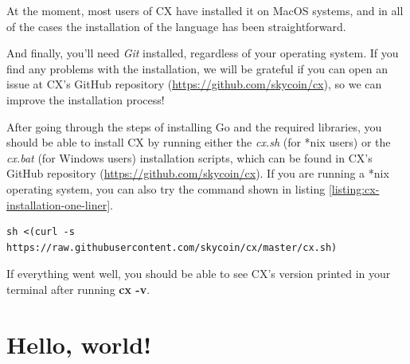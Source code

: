 \documentclass[11pt,fleqn,openany]{book} %
\begin{document}
At the moment, most users of CX have installed it on MacOS systems, and in all of the cases the installation of the language has been straightforward.

And finally, you'll need \emph{Git} installed, regardless of your operating system. If you find any problems with the installation, we will be grateful if you can open an issue at CX's GitHub repository (\url{https://github.com/skycoin/cx}), so we can improve the installation process!

After going through the steps of installing Go and the required libraries, you should be able to install CX by running either the \emph{cx.sh} (for *nix users) or the \emph{cx.bat} (for Windows users) installation scripts, which can be found in CX's GitHub repository (\url{https://github.com/skycoin/cx}). If you are running a *nix operating system, you can also try the command shown in listing \ref{listing:cx-installation-one-liner}.

\begin{lstlisting}[caption={One-liner CX installation script for *nix systems},captionpos=b,label={listing:cx-installation-one-liner}]
sh <(curl -s https://raw.githubusercontent.com/skycoin/cx/master/cx.sh)
\end{lstlisting}

If everything went well, you should be able to see CX's version printed in your terminal after running \textbf{cx -v}.

\section{Hello, world!}
\label{subsection:hello-world}

\end{document}
